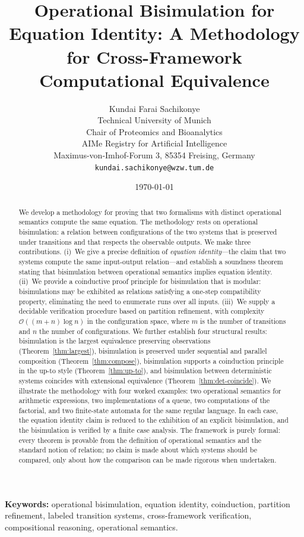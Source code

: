 \documentclass[twocolumn,11pt,a4paper]{article}
\title{\textbf{Operational Bisimulation for\\[3pt]
Equation Identity: A Methodology\\[2pt]
for Cross-Framework Computational Equivalence}}
\author{Kundai Farai Sachikonye\\
Technical University of Munich\\
Chair of Proteomics and Bioanalytics\\
AIMe Registry for Artificial Intelligence\\
Maximus-von-Imhof-Forum 3, 85354 Freising, Germany\\
\texttt{kundai.sachikonye@wzw.tum.de}}
\date{\today}
\begin{document}
\maketitle

\begin{abstract}
We develop a methodology for proving that two formalisms with distinct operational semantics compute the same equation. The methodology rests on operational bisimulation: a relation between configurations of the two systems that is preserved under transitions and that respects the observable outputs. We make three contributions. (i)~We give a precise definition of \emph{equation identity}---the claim that two systems compute the same input-output relation---and establish a soundness theorem stating that bisimulation between operational semantics implies equation identity. (ii)~We provide a coinductive proof principle for bisimulation that is modular: bisimulations may be exhibited as relations satisfying a one-step compatibility property, eliminating the need to enumerate runs over all inputs. (iii)~We supply a decidable verification procedure based on partition refinement, with complexity $\mathcal{O}((m + n) \log n)$ in the configuration space, where $m$ is the number of transitions and $n$ the number of configurations. We further establish four structural results: bisimulation is the largest equivalence preserving observations (Theorem~\ref{thm:largest}), bisimulation is preserved under sequential and parallel composition (Theorem~\ref{thm:compose}), bisimulation supports a coinduction principle in the up-to style (Theorem~\ref{thm:up-to}), and bisimulation between deterministic systems coincides with extensional equivalence (Theorem~\ref{thm:det-coincide}). We illustrate the methodology with four worked examples: two operational semantics for arithmetic expressions, two implementations of a queue, two computations of the factorial, and two finite-state automata for the same regular language. In each case, the equation identity claim is reduced to the exhibition of an explicit bisimulation, and the bisimulation is verified by a finite case analysis. The framework is purely formal: every theorem is provable from the definition of operational semantics and the standard notion of relation; no claim is made about which systems should be compared, only about how the comparison can be made rigorous when undertaken.
\end{abstract}

\noindent\textbf{Keywords:} operational bisimulation, equation identity, coinduction, partition refinement, labeled transition systems, cross-framework verification, compositional reasoning, operational semantics.
\end{document}
